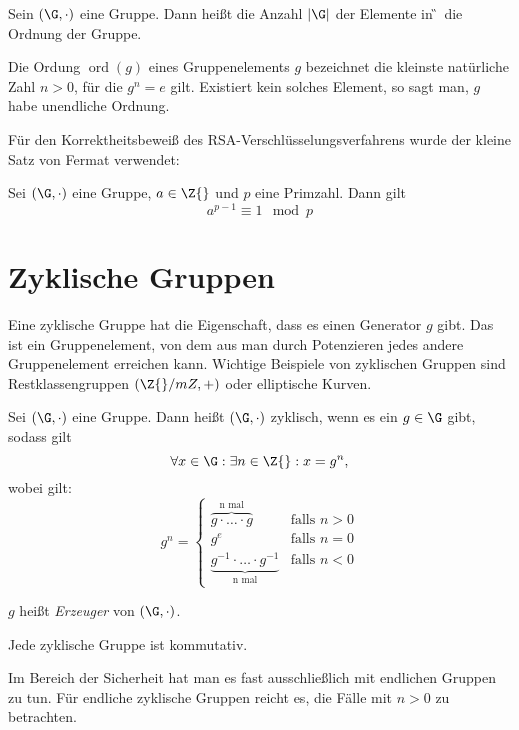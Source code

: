 \begin{definition}
  Sein $(\G, \cdot)$ eine Gruppe. Dann heißt die Anzahl $|\G|$ der Elemente in
  \G~die Ordnung der Gruppe.
\end{definition}

\begin{definition}
  Die Ordung $\operatorname{ord}(g) $ eines Gruppenelements $g$
  bezeichnet die kleinste 
  natürliche Zahl $n>0$, für die $g^n = e$ gilt. Existiert kein solches
  Element, so sagt man, $g$ habe unendliche Ordnung.
 \end{definition}

Für den Korrektheitsbeweiß des RSA-Verschlüsselungsverfahrens wurde der
kleine Satz von Fermat verwendet: 
 \begin{theorem}
   Sei $(\G, \cdot)$ eine Gruppe, $a \in \Z{}$ und $p$ eine
   Primzahl. Dann gilt
   \[a^{p-1} \equiv 1 \mod p\]
 \end{theorem}
\section{Zyklische Gruppen}
Eine zyklische Gruppe hat die Eigenschaft, dass es einen Generator $g$
gibt. Das ist ein Gruppenelement, von dem aus man durch Potenzieren
jedes andere Gruppenelement erreichen kann. Wichtige Beispiele von
zyklischen Gruppen sind Restklassengruppen $(\Z{}/mZ, +)$ oder
elliptische Kurven.

\begin{definition}
  Sei $(\G, \cdot)$ eine Gruppe. Dann heißt $(\G, \cdot)$ zyklisch, wenn
  es ein $g \in \G$ gibt, sodass gilt
  \[
    \forall x \in \G: \exists n \in \Z{}: x=g^n,
  \]
  wobei gilt:
\[
 g^n = 
  \begin{cases} 
   \overbrace{g \cdot \dotsc \cdot g}^{\text{n mal}} & \text{falls } n > 0 \\
   g^e       & \text{falls } n = 0 \\
   \underbrace{g^{-1} \cdot \dotsc \cdot g^{-1}}_{\text{n mal}} &
   \text{falls }n < 0
  \end{cases}
\]

$g$ heißt \textit{Erzeuger} von $(\G, \cdot)$. 
\end{definition}
Jede zyklische Gruppe ist kommutativ.

Im Bereich der Sicherheit hat man es fast ausschließlich mit endlichen
Gruppen zu tun. Für endliche zyklische Gruppen reicht es, die Fälle mit
$n>0$ zu betrachten. 

